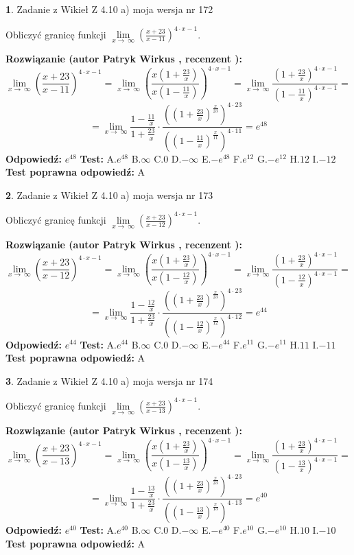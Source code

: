 \documentclass[12pt, a4paper]{article}
\theoremstyle{definition} %
\newtheorem{zad}{}
\newcommand{\zadStart}[1]{\begin{zad}#1\newline}
\newcommand{\zadStop}{\end{zad}}
\newcommand{\rozwStart}[2]{\noindent \textbf{Rozwiązanie (autor #1 , recenzent #2): }\newline}
\newcommand{\rozwStop}{\newline}
\newcommand{\odpStart}{\noindent \textbf{Odpowiedź:}\newline}
\newcommand{\odpStop}{\newline}
\newcommand{\testStart}{\noindent \textbf{Test:}\newline}
\newcommand{\testStop}{\newline}
\newcommand{\kluczStart}{\noindent \textbf{Test poprawna odpowiedź:}\newline}
\newcommand{\kluczStop}{\newline}
\begin{document}
\zadStart{Zadanie z Wikieł Z 4.10 a) moja wersja nr 172}

Obliczyć granicę funkcji  $\lim\limits_{x\to\ \infty}(\frac{x+23}{x-11})^{4\cdot x-1}$.
\zadStop
\rozwStart{Patryk Wirkus}{}
$$\lim\limits_{x\to\ \infty}(\frac{x+23}{x-11})^{4\cdot x-1} = \lim\limits_{x\to\ \infty}(\frac{x(1+\frac{23}{x})}{x(1-\frac{11}{x})})^{4\cdot x-1}=\lim\limits_{x\to\ \infty}\frac{(1+\frac{23}{x})^{4\cdot x-1}}{(1-\frac{11}{x})^{4\cdot x-1}}=$$
$$=\lim\limits_{x\to\ \infty}\frac{1-\frac{11}{x}}{1+\frac{23}{x}}\cdot\frac{((1+\frac{23}{x})^{\frac{x}{23}})^{4\cdot23}}{((1-\frac{11}{x})^{\frac{x}{11}})^{4\cdot11}}=e^{48}$$
\rozwStop
\odpStart
$e^{48}$
\odpStop
\testStart
A.$e^{48}$ B.$\infty$ C.$0$ D.$-\infty$ E.$-e^{48}$
F.$e^{12}$ G.$-e^{12}$
H.$12$
I.$-12$
\testStop
\kluczStart
A
\kluczStop



\zadStart{Zadanie z Wikieł Z 4.10 a) moja wersja nr 173}

Obliczyć granicę funkcji  $\lim\limits_{x\to\ \infty}(\frac{x+23}{x-12})^{4\cdot x-1}$.
\zadStop
\rozwStart{Patryk Wirkus}{}
$$\lim\limits_{x\to\ \infty}(\frac{x+23}{x-12})^{4\cdot x-1} = \lim\limits_{x\to\ \infty}(\frac{x(1+\frac{23}{x})}{x(1-\frac{12}{x})})^{4\cdot x-1}=\lim\limits_{x\to\ \infty}\frac{(1+\frac{23}{x})^{4\cdot x-1}}{(1-\frac{12}{x})^{4\cdot x-1}}=$$
$$=\lim\limits_{x\to\ \infty}\frac{1-\frac{12}{x}}{1+\frac{23}{x}}\cdot\frac{((1+\frac{23}{x})^{\frac{x}{23}})^{4\cdot23}}{((1-\frac{12}{x})^{\frac{x}{12}})^{4\cdot12}}=e^{44}$$
\rozwStop
\odpStart
$e^{44}$
\odpStop
\testStart
A.$e^{44}$ B.$\infty$ C.$0$ D.$-\infty$ E.$-e^{44}$
F.$e^{11}$ G.$-e^{11}$
H.$11$
I.$-11$
\testStop
\kluczStart
A
\kluczStop



\zadStart{Zadanie z Wikieł Z 4.10 a) moja wersja nr 174}

Obliczyć granicę funkcji  $\lim\limits_{x\to\ \infty}(\frac{x+23}{x-13})^{4\cdot x-1}$.
\zadStop
\rozwStart{Patryk Wirkus}{}
$$\lim\limits_{x\to\ \infty}(\frac{x+23}{x-13})^{4\cdot x-1} = \lim\limits_{x\to\ \infty}(\frac{x(1+\frac{23}{x})}{x(1-\frac{13}{x})})^{4\cdot x-1}=\lim\limits_{x\to\ \infty}\frac{(1+\frac{23}{x})^{4\cdot x-1}}{(1-\frac{13}{x})^{4\cdot x-1}}=$$
$$=\lim\limits_{x\to\ \infty}\frac{1-\frac{13}{x}}{1+\frac{23}{x}}\cdot\frac{((1+\frac{23}{x})^{\frac{x}{23}})^{4\cdot23}}{((1-\frac{13}{x})^{\frac{x}{13}})^{4\cdot13}}=e^{40}$$
\rozwStop
\odpStart
$e^{40}$
\odpStop
\testStart
A.$e^{40}$ B.$\infty$ C.$0$ D.$-\infty$ E.$-e^{40}$
F.$e^{10}$ G.$-e^{10}$
H.$10$
I.$-10$
\testStop
\kluczStart
A
\kluczStop
\end{document}
